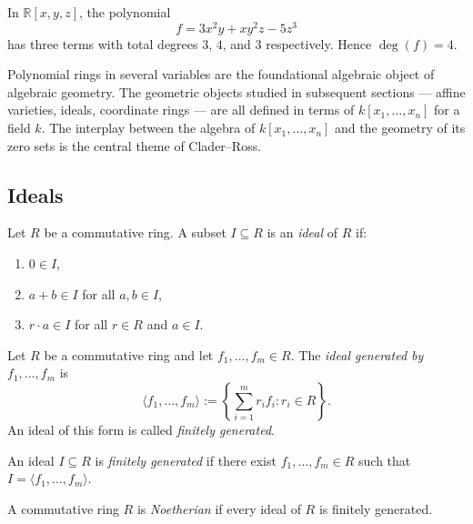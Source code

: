 \begin{example}
In $\mathbb{R}[x,y,z]$, the polynomial
\[
f = 3x^2 y + xy^2 z - 5z^3
\]
has three terms with total degrees $3$, $4$, and $3$ respectively.
Hence $\deg(f) = 4$.
\end{example}

\begin{remark}
Polynomial rings in several variables are the foundational
algebraic object of algebraic geometry.
The geometric objects studied in subsequent sections ---
affine varieties, ideals, coordinate rings ---
are all defined in terms of $k[x_1, \dots, x_n]$
for a field $k$.
The interplay between the algebra of $k[x_1,\dots,x_n]$
and the geometry of its zero sets is the central theme
of Clader--Ross.
\end{remark}

\subsection*{Ideals}

\begin{definition}[Ideal]
Let $R$ be a commutative ring.
A subset $I \subseteq R$ is an \emph{ideal} of $R$ if:
\begin{enumerate}
\item $0 \in I$,
\item $a + b \in I$ for all $a, b \in I$,
\item $r \cdot a \in I$ for all $r \in R$ and $a \in I$.
\end{enumerate}
\end{definition}

\begin{definition}
Let $R$ be a commutative ring and let $f_1, \dots, f_m \in R$.
The \emph{ideal generated by} $f_1, \dots, f_m$ is
\[
\langle f_1, \dots, f_m \rangle
:= \left\{ \sum_{i=1}^m r_i f_i : r_i \in R \right\}.
\]
An ideal of this form is called \emph{finitely generated}.
\end{definition}

\begin{definition}
An ideal $I \subseteq R$ is \emph{finitely generated} if there exist
$f_1, \dots, f_m \in R$ such that $I = \langle f_1, \dots, f_m \rangle$.
\end{definition}

\begin{definition}
A commutative ring $R$ is \emph{Noetherian} if every ideal of $R$
is finitely generated.
\end{definition}

